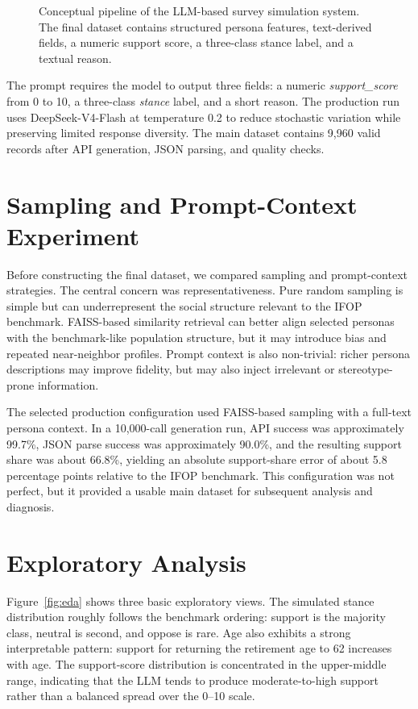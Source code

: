 ﻿\documentclass[sigconf,nonacm]{acmart}
\newcommand{\stance}{\textit{stance}}
\newcommand{\score}{\textit{support\_score}}
\begin{document}
\begin{figure}[t]
  \centering
  \caption{Conceptual pipeline of the LLM-based survey simulation system. The final dataset contains structured persona features, text-derived fields, a numeric support score, a three-class stance label, and a textual reason.}
  \label{fig:pipeline}
\end{figure}

The prompt requires the model to output three fields: a numeric \score{} from 0 to 10, a three-class \stance{} label, and a short reason. The production run uses DeepSeek-V4-Flash at temperature 0.2 to reduce stochastic variation while preserving limited response diversity. The main dataset contains 9,960 valid records after API generation, JSON parsing, and quality checks.

\section{Sampling and Prompt-Context Experiment}
Before constructing the final dataset, we compared sampling and prompt-context strategies. The central concern was representativeness. Pure random sampling is simple but can underrepresent the social structure relevant to the IFOP benchmark. FAISS-based similarity retrieval can better align selected personas with the benchmark-like population structure, but it may introduce bias and repeated near-neighbor profiles. Prompt context is also non-trivial: richer persona descriptions may improve fidelity, but may also inject irrelevant or stereotype-prone information.

The selected production configuration used FAISS-based sampling with a full-text persona context. In a 10,000-call generation run, API success was approximately 99.7\%, JSON parse success was approximately 90.0\%, and the resulting support share was about 66.8\%, yielding an absolute support-share error of about 5.8 percentage points relative to the IFOP benchmark. This configuration was not perfect, but it provided a usable main dataset for subsequent analysis and diagnosis.

\section{Exploratory Analysis}
Figure~\ref{fig:eda} shows three basic exploratory views. The simulated stance distribution roughly follows the benchmark ordering: support is the majority class, neutral is second, and oppose is rare. Age also exhibits a strong interpretable pattern: support for returning the retirement age to 62 increases with age. The support-score distribution is concentrated in the upper-middle range, indicating that the LLM tends to produce moderate-to-high support rather than a balanced spread over the 0--10 scale.
\end{document}
